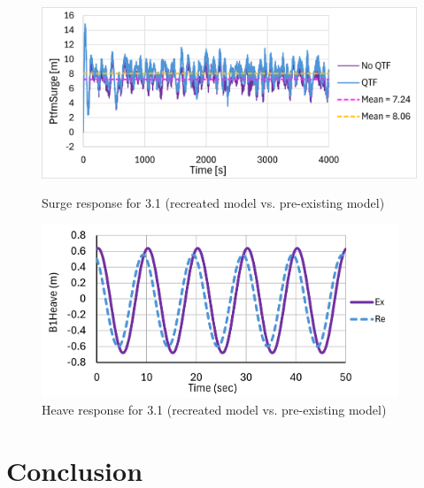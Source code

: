 \documentclass[a4paper, 11pt]{article}
\begin{document}
\begin{figure}[H]
    \begin{minipage}{0.48\textwidth}
        \centering
        \includegraphics[width=1\textwidth]{3.2_turb_surge.png}
        \caption{\small Surge response for 3.1 (recreated model vs. pre-existing model)}
        \label{fig:3.1_surge_mine_recreated}
    \end{minipage}
    \hfill
    \begin{minipage}{0.5\textwidth}
        \centering
        \includegraphics[width=0.95\textwidth]{3.1_heave_mine.png}
        \caption{\small Heave response for 3.1 (recreated model vs. pre-existing model)}
        \label{fig:3.1_heave_mine_recreated}
    \end{minipage}
\end{figure}


\section{Conclusion}%
\end{document}
